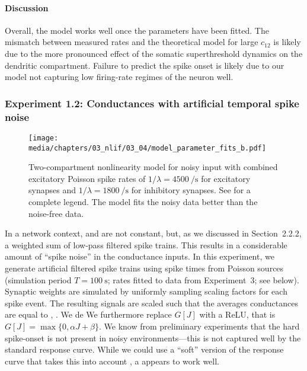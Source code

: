 \paragraph{Discussion}
Overall, the model works well once the parameters have been fitted.
The mismatch between measured rates and the theoretical model for large $c_{12}$ is likely due to the more pronounced effect of the somatic superthreshold dynamics on the dendritic compartment.
Failure to predict the spike onset is likely due to our model not capturing low firing-rate regimes of the neuron well.

\subsubsection{Experiment 1.2: Conductances with artificial temporal spike noise}

\begin{figure}[t]
	\texttt{[image: media/chapters/03\_nlif/03\_04/model\_parameter\_fits\_b.pdf]}%
	\caption[Two-compartment nonlinearity model for noisy input]{Two-compartment nonlinearity model for noisy input with combined excitatory Poisson spike rates of $1/\lambda = \SI{4500}{\per\second}$ for excitatory synapses and $1/\lambda = \SI{1800}{\per\second}$ for inhibitory synapses.
	See  for a complete legend.
	The model fits the noisy data better than the noise-free data.
	    }
	\label{fig:synaptic_nonlinearity_fit_b}%
\end{figure}

In a network context, \gE and \gI are not constant, but, as we discussed in Section~2.2.2, a weighted sum of low-pass filtered spike trains.
This results in a considerable amount of \enquote{spike noise} in the conductance inputs.
In this experiment, we generate artificial filtered spike trains using spike times from Poisson sources (simulation period $T = \SI{100}{\second}$; rates fitted to data from Experiment~3; see below).
Synaptic weights are simulated by uniformly sampling scaling factors for each spike event.
The resulting signals are scaled such that the averages conductances are equal to \gE, \gI.
We de
We furthermore replace $G[J]$ with a ReLU, that is $G[J] = \max\{ 0, \alpha J + \beta \}$.
We know from preliminary experiments that the hard \LIF spike-onset is not present in noisy environments---this is not captured well by the standard \LIF response curve.
While we could use a \enquote{soft} version of the \LIF response curve that takes this into account \citep[cf.][]{capocelli1971diffusion,hunsberger2014competing,kreutz2015mean}, a \ReLU appears to work well.

